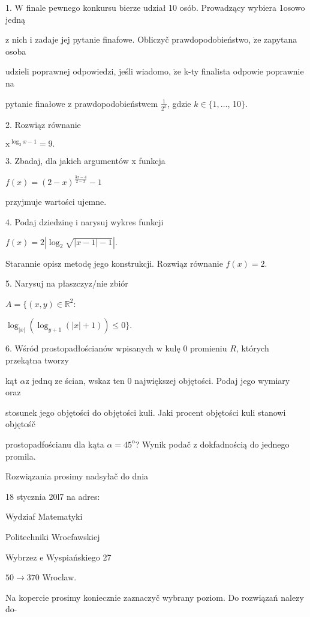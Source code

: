 \documentclass[a4paper,12pt]{article}
\begin{document}
1. $\mathrm{W}$ finale pewnego konkursu bierze udział 10 osób. Prowadzący wybiera 1osowo jedną

$\mathrm{z}$ nich $\mathrm{i}$ zadaje jej pytanie finafowe. Obliczyč prawdopodobieństwo, $\dot{\mathrm{z}}\mathrm{e}$ zapytana osoba

udzieli poprawnej odpowiedzi, jeśli wiadomo, $\dot{\mathrm{z}}\mathrm{e}$ k-ty finalista odpowie poprawnie na

pytanie finałowe $\mathrm{z}$ prawdopodobieństwem $\displaystyle \frac{1}{2^{k}}$, gdzie $k\in\{1, \ldots$, 10$\}.$

2. Rozwiąz równanie

$\mathrm{x}^{\log_{3}x-1}=9.$

3. Zbadaj, dla jakich argumentów x funkcja

$f(x)=(2-x)^{\frac{3x-4}{2-x}}-1$

przyjmuje wartości ujemne.

4. Podaj dziedzinę $\mathrm{i}$ narysuj wykres funkcji

$f(x)=2|\log_{2}\sqrt{|x-1|-1}|.$

Starannie opisz metodę jego konstrukcji. Rozwiąz równanie $f(x)=2.$

5. Narysuj na płaszczyz/nie zbiór

$A=\{(x,y)\in \mathbb{R}^{2}$:

$\log_{|x|}(\log_{y+1}(|x|+1)) \leq 0\}.$

6. Wśród prostopadłościanów wpisanych $\mathrm{w}$ kulę $0$ promieniu $R$, których przekątna tworzy

kąt $\alpha \mathrm{z}$ jednq ze ścian, wskaz ten $0$ największej objętości. Podaj jego wymiary oraz

stosunek jego objętości do objętości kuli. Jaki procent objętości kuli stanowi objętośč

prostopadfościanu dla kąta $\alpha=45^{\mathrm{o}}$? Wynik podač $\mathrm{z}$ dokfadnością do jednego promila.

Rozwiązania prosimy nadsyłač do dnia

18 stycznia 20l7 na adres:

Wydziaf Matematyki

Politechniki Wrocfawskiej

Wybrzez $\mathrm{e}$ Wyspiańskiego 27

$50\rightarrow 370$ Wroclaw.

Na kopercie prosimy koniecznie zaznaczyč wybrany poziom. Do rozwiązań nalez$\mathrm{y}$ do-
\end{document}
